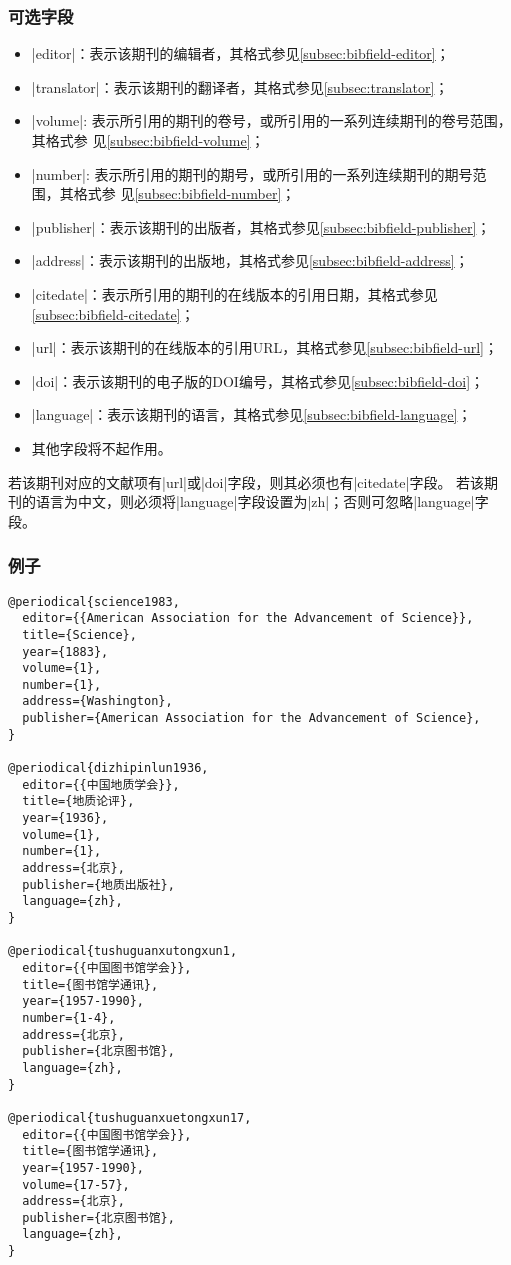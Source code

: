 \subsubsection{可选字段}

\begin{itemize}
\item |editor|：表示该期刊的编辑者，其格式参见\ref{subsec:bibfield-editor}；
\item |translator|：表示该期刊的翻译者，其格式参见\ref{subsec:translator}；
\item |volume|: 表示所引用的期刊的卷号，或所引用的一系列连续期刊的卷号范围，其格式参
  见\ref{subsec:bibfield-volume}；
\item |number|: 表示所引用的期刊的期号，或所引用的一系列连续期刊的期号范围，其格式参
  见\ref{subsec:bibfield-number}；
\item |publisher|：表示该期刊的出版者，其格式参见\ref{subsec:bibfield-publisher}；
\item |address|：表示该期刊的出版地，其格式参见\ref{subsec:bibfield-address}；  
\item |citedate|：表示所引用的期刊的在线版本的引用日期，其格式参见\ref{subsec:bibfield-citedate}；
\item |url|：表示该期刊的在线版本的引用URL，其格式参见\ref{subsec:bibfield-url}；
\item |doi|：表示该期刊的电子版的DOI编号，其格式参见\ref{subsec:bibfield-doi}；
\item |language|：表示该期刊的语言，其格式参见\ref{subsec:bibfield-language}；
\item 其他字段将不起作用。
\end{itemize}

\begin{note}
若该期刊对应的文献项有|url|或|doi|字段，则其必须也有|citedate|字段。
若该期刊的语言为中文，则必须将|language|字段设置为|zh|；否则可忽略|language|字段。
\end{note}

\subsubsection{例子}

\begin{verbatim}
@periodical{science1983,
  editor={{American Association for the Advancement of Science}},
  title={Science},
  year={1883},
  volume={1},
  number={1},
  address={Washington},
  publisher={American Association for the Advancement of Science},
}

@periodical{dizhipinlun1936,
  editor={{中国地质学会}},
  title={地质论评},
  year={1936},
  volume={1},
  number={1},
  address={北京},
  publisher={地质出版社},
  language={zh},
}

@periodical{tushuguanxutongxun1,
  editor={{中国图书馆学会}},
  title={图书馆学通讯},
  year={1957-1990},
  number={1-4},
  address={北京},
  publisher={北京图书馆},
  language={zh},
}

@periodical{tushuguanxuetongxun17,
  editor={{中国图书馆学会}},
  title={图书馆学通讯},
  year={1957-1990},
  volume={17-57},
  address={北京},
  publisher={北京图书馆},
  language={zh},
}
\end{verbatim}


